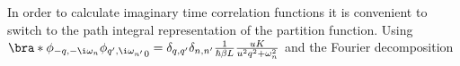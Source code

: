 \documentclass[english, parskip=full]{scrartcl}
\begin{document}
In order to calculate imaginary time correlation functions it is convenient to switch to the path integral representation of the partition function.
Using $\bra*{\phi_{-q,-\i\omega_n} \phi_{q',\i\omega_{n'}}}_0 = \delta_{q,q'} \delta_{n,n'} \frac{1}{\hbar\beta L} \frac{uK}{u^2q^2 + \omega_n^2}$ and the Fourier decomposition 
\end{document}
